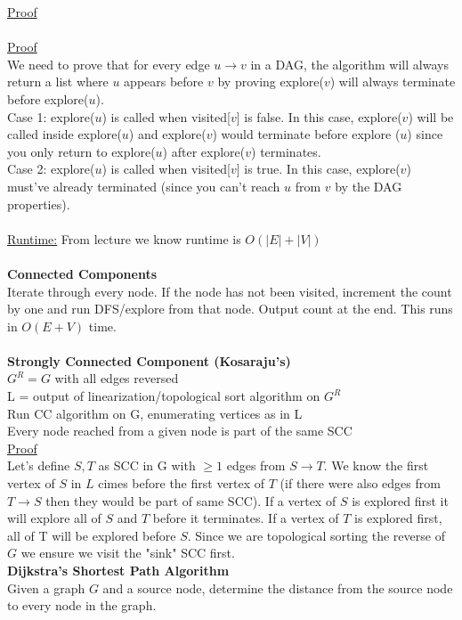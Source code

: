 \documentclass{article}
\begin{document}
\begin{multicols}{2}
\underline{Proof} \\ \\
\underline{Proof}\\
We need to prove that for every edge $u \to v$ in a DAG, the algorithm will always return a list where $u$ appears before $v$ by proving explore($v$) will always terminate before explore($u$). \\
Case 1: explore($u$) is called when visited[$v$] is false. In this case, explore($v$) will be called inside explore($u$) and explore($v$) would terminate before explore ($u$) since you only return to explore($u$) after explore($v$) terminates. \\
Case 2: explore($u$) is called when visited[$v$] is true. In this case, explore($v$) must've already terminated (since you can't reach $u$ from $v$ by the DAG properties). \\ \\
\underline{Runtime:} From lecture we know runtime is $O(|E| + |V|)$ \\ \\
\textbf{Connected Components}\\
Iterate through every node. If the node has not been visited, increment the count by one and run DFS/explore from that node. Output count at the end. This runs in $O(E + V)$ time. \\ \\
\textbf{Strongly Connected Component (Kosaraju's)} \\
$G^R = G$ with all edges reversed \\
L = output of linearization/topological sort algorithm on $G^R$ \\
Run CC algorithm on G, enumerating vertices as in L \\
Every node reached from a given node is part of the same SCC \\ 
\underline{Proof}\\
Let's define $S, T$ as SCC in G with $\geq 1$ edges from $S \to T$. We know the first vertex of $S$ in $L$ cimes before the first vertex of $T$ (if there were also edges from $T \to S$ then they would be part of same SCC). If a vertex of $S$ is explored first it will explore all of $S$ and $T$ before it terminates. If a vertex of $T$ is explored first, all of T will be explored before $S$. Since we are topological sorting the reverse of $G$ we ensure we visit the "sink" SCC first. \\ 
\textbf{Dijkstra's Shortest Path Algorithm} \\
Given a graph $G$ and a source node, determine the distance from the source node to every node in the graph. \\ \\

\end{multicols}
\end{document}
